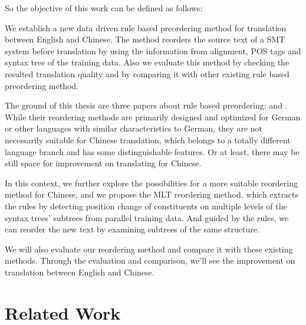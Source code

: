 So the objective of this work can be defined as follows:

\begin{center}
\parbox[c]{0.8\textwidth}{
We establish a new data driven rule based preordering method for translation between English and Chinese. The method reorders the source text of a SMT system before translation by using the information from alignment, POS tags and syntax tree of the training data. Also we evaluate this method by checking the resulted translation quality and by comparing it with other existing rule based preordering method.
}
\end{center}

The ground of this thesis are three papers about rule based preordering: \cite{short, long} and \cite{tree}. While their reordering methods are primarily designed and optimized for German or other languages with similar characteristics to German, they are not necessarily suitable for Chinese translation, which belongs to a totally different language branch and has some distinguishable features. Or at least, there may be still space for improvement on translating for Chinese.

In this context, we further explore the possibilities for a more suitable reordering method for Chinese, and we propose the MLT reordering method, which extracts the rules by detecting position change of constituents on multiple levels of the syntax trees' subtrees from parallel training data. And guided by the rules, we can reorder the new text by examining subtrees of the same structure.

We will also evaluate our reordering method and compare it with these existing methods. Through the evaluation and comparison, we'll see the improvement on translation between English and Chinese. 





\section{Related Work}
\label{ch:Introduction:sec:RelatedWork}

